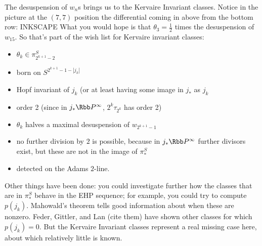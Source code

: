 The desuspension of $w_n$s brings us to the Kervaire Invariant classes.  Notice in the picture at the $(7, 7)$ position the differential coming in above from the bottom row: INKSCAPE  What you would hope is that $\theta_3 = \frac{1}{2}$ times the desuspension of $w_15$.  So that's part of the wish list for Kervaire invariant classes:
\begin{itemize}
\item $\theta_k \in \pi^S_{2^{k+1}-2}$
\item born on $S^{2^{k+1} - 1 - |j_k|}$
\item Hopf invariant of $j_k$ (or at least having some image in $j_*$ as $j_k$
\item order 2 (since in $j_* \RP^\infty$, $2^k \tau_{2^k}$ has order 2)
\item $\theta_k$ halves a maximal desuspension of $w_{2^{k+1}-1}$
\item no further division by $2$ is possible, because in $j_* \RP^\infty$ further divisors exist, but these are not in the image of $\pi_*^S$
\item detected on the Adams $2$-line.
\end{itemize}
Other things have been done: you could investigate further how the classes that are in $\pi_*^S$ behave in the EHP sequence; for example, you could try to compute $p(j_k)$.  Mahowald's theorem tells good information about when these are nonzero.  Feder, Gittler, and Lan (cite them) have shown other classes for which $p(j_k) = 0$.  But the Kervaire Invariant classes represent a real missing case here, about which relatively little is known.
\fi
\BoxedNote{}
